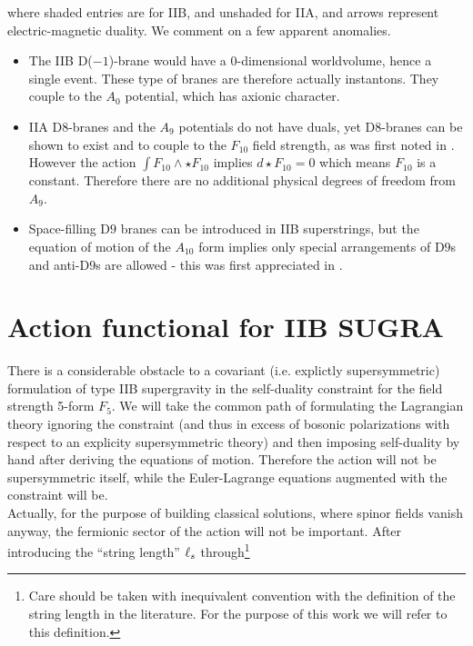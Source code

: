 where shaded entries are for IIB, and unshaded for IIA, and arrows represent electric-magnetic duality. We comment on a few apparent anomalies.

\begin{itemize}
	\item The IIB D($-1$)-brane would have a $0$-dimensional worldvolume, hence a single event. These type of branes are therefore actually instantons. They couple to the $A_0$ potential, which has axionic character.
	\item IIA D$8$-branes and the $A_9$ potentials do not have duals, yet D$8$-branes can be shown to exist and to couple to the $F_{10}$ field strength, as was first noted in \cite{pcA9}. However the action $\int F_{10} \wedge \star F_{10}$ implies $d\star F_{10} = 0$ which means $F_{10}$ is a constant. Therefore there are no additional physical degrees of freedom from $A_9$.
	\item Space-filling D$9$ branes can be introduced in IIB superstrings, but the equation of motion of the $A_{10}$ form implies only special arrangements of D$9$s and anti-D$9$s are allowed - this was first appreciated in \cite{pcA10}.
\end{itemize}


\section{Action functional for IIB SUGRA}\label{sec:sugra}

There is a considerable obstacle to a covariant (i.e. explictly supersymmetric) formulation of type IIB supergravity in the self-duality constraint for the field strength 5-form $F_5$. We will take the common path of formulating the Lagrangian theory ignoring the constraint (and thus in excess of bosonic polarizations with respect to an explicity supersymmetric theory) and then imposing self-duality by hand after deriving the equations of motion. Therefore the action will not be supersymmetric itself, while the Euler-Lagrange equations augmented with the constraint will be.\\


Actually, for the purpose of building classical solutions, where spinor fields vanish anyway, the fermionic sector of the action will not be important. After introducing the ``string length'' $\ell_s$ through\footnote{Care should be taken with inequivalent convention with the definition of the string length in the literature. For the purpose of this work we will refer to this definition.} 

